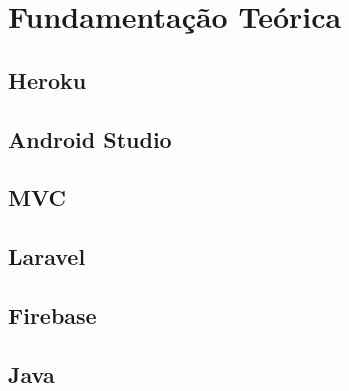 \chapter{Fundamentação Teórica}

\section{Heroku}

\section{Android Studio}

\section{MVC}

\section{Laravel}

\section{Firebase}

\section{Java}
